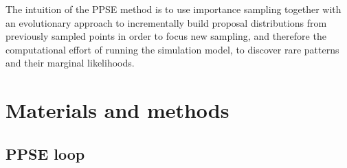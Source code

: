 \documentclass[10pt,letterpaper]{article}
\theoremstyle{definition}
\theoremstyle{remark}
\begin{document}
\medskip
The intuition of the PPSE method is to use importance sampling together with an evolutionary approach to incrementally build proposal distributions from previously sampled points in order to focus new sampling, and therefore the computational effort of running the simulation model, to discover rare patterns and their marginal likelihoods.










\section*{Materials and methods}
\label{sec. algoDescription}







\subsection*{PPSE loop}
\end{document}
